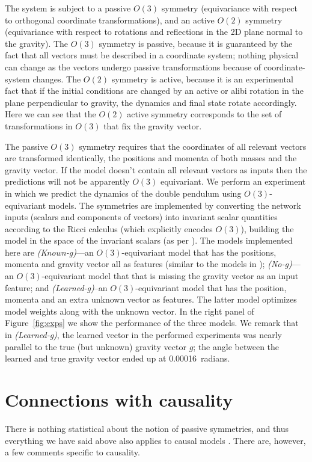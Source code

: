 \documentclass[preprint]{article} %
\newcommand{\figref}[1]{Figure~\ref{#1}}
\begin{document}
The system is subject to a passive $O(3)$ symmetry (equivariance with respect to orthogonal coordinate transformations), and an active $O(2)$ symmetry (equivariance with respect to rotations and reflections in the 2D plane normal to the gravity). 
The $O(3)$ symmetry is passive, because it is guaranteed by the fact that all vectors must be described in a coordinate system; nothing physical can change as the vectors undergo passive transformations because of coordinate-system changes.
The $O(2)$ symmetry is active, because it is an experimental fact that if the initial conditions are changed by an active or alibi rotation in the plane perpendicular to gravity, the dynamics and final state rotate accordingly.
Here we can see that the $O(2)$ active symmetry corresponds to the set of transformations in $O(3)$ that fix the gravity vector. 

The passive $O(3)$ symmetry requires that the coordinates of all relevant vectors are transformed identically, the positions and momenta of both masses and the gravity vector.
If the model doesn't contain all relevant vectors as inputs then the predictions will not be apparently $O(3)$ equivariant.
We perform an experiment in which we predict the dynamics of the double pendulum using $O(3)$-equivariant models.
The symmetries are implemented by converting the network inputs (scalars and components of vectors) into invariant scalar quantities according to the Ricci calculus (which explicitly encodes $O(3)$), building the model in the space of the invariant scalars (as per \citealt{villar2021scalars}).
The models implemented here are \textsl{(Known-g)}---an $O(3)$-equivariant model that has the positions, momenta and gravity vector all as features (similar to the models in \citealt{villar2021scalars, yao2021simple}); \textsl{(No-g)}---an $O(3)$-equivariant model that that is missing the gravity vector as an input feature; and \textsl{(Learned-g)}\---an $O(3)$-equivariant model that has the position, momenta and an extra unknown vector as features.
The latter model optimizes model weights along with the unknown vector. 
In the right panel of \figref{fig:exps} we show the performance of the three models.
We remark that in \textsl{(Learned-g)}, the learned vector in the performed experiments was nearly parallel to the true (but unknown) gravity vector $g$; the angle between the learned and true gravity vector ended up at 0.00016~radians.

\section{Connections with causality}\label{sec:causality}
There is nothing statistical about the notion of passive symmetries, and thus everything we have said above also applies to causal models \citep{PetJanSch17}.
There are, however, a few comments specific to causality.
\end{document}
